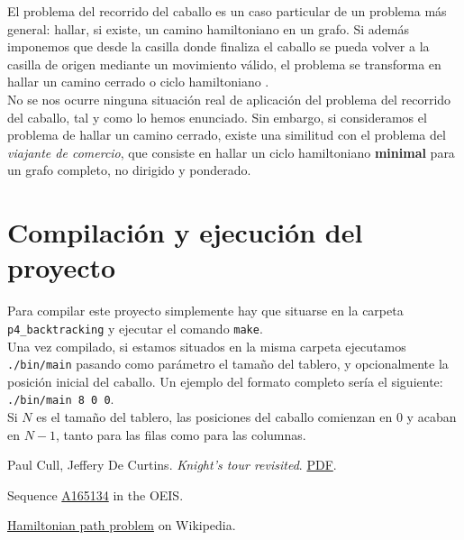 \documentclass[11pt]{article}
\begin{document}
El problema del recorrido del caballo es un caso particular de un problema más general: hallar, si existe, un camino hamiltoniano \cite{wiki} en un grafo. Si además imponemos que desde la casilla donde finaliza el caballo se pueda volver a la casilla de origen mediante un movimiento válido, el problema se transforma en hallar un camino cerrado o ciclo hamiltoniano \cite{wiki}.\\

No se nos ocurre ninguna situación real de aplicación del problema del recorrido del caballo, tal y como lo hemos enunciado. Sin embargo, si consideramos el problema de hallar un camino cerrado, existe una similitud con el problema del \textit{viajante de comercio}, que consiste en hallar un ciclo hamiltoniano \textbf{minimal} para un grafo completo, no dirigido y ponderado.\\

\section*{Compilación y ejecución del proyecto}
Para compilar este proyecto simplemente hay que situarse en la carpeta \verb|p4_backtracking| y ejecutar el comando \verb|make|.\\

Una vez compilado, si estamos situados en la misma carpeta ejecutamos \verb|./bin/main| pasando como parámetro el tamaño del tablero, y opcionalmente la posición inicial del caballo. Un ejemplo del formato completo sería el siguiente: \verb|./bin/main 8 0 0|.\\

Si $N$ es el tamaño del tablero, las posiciones del caballo comienzan en $0$ y acaban en $N-1$, tanto para las filas como para las columnas.

\begin{thebibliography}{9}

  Paul Cull, Jeffery De Curtins.
  \emph{Knight's tour revisited}.
   \href{http://www.fq.math.ca/Scanned/16-3/cull.pdf}{PDF}.

  Sequence
  \href{https://oeis.org/A165134}{A165134} in the OEIS.

  \href{https://en.wikipedia.org/wiki/Hamiltonian_path_problem}{Hamiltonian path problem} on Wikipedia.

\end{thebibliography}
\end{document}
